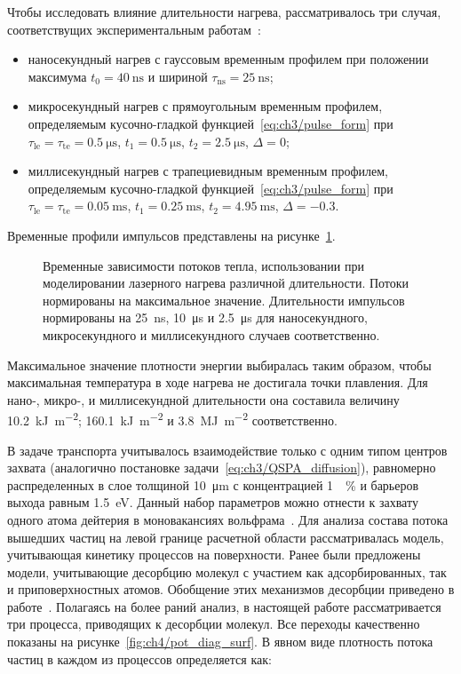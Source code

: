 Чтобы исследовать влияние длительности нагрева, рассматривалось три случая, соответствущих экспериментальным работам~\cite{Zlobinski2019,Zlobinski2020,Gasparyan2021}:
\begin{itemize}
    \item наносекундный нагрев с гауссовым временным профилем при положении максимума \( t_0 = \SI{40}{\nano\second} \) и шириной \(\tau_\mathrm{ns}=\SI{25}{\nano\second} \);
    \item микросекундный нагрев с прямоугольным временным профилем, определяемым кусочно-гладкой функцией~\cref{eq:ch3/pulse_form} при \(\tau_\mathrm{le}=\tau_\mathrm{te}=\SI{0.5}{\micro\second}\), \(t_1=\SI{0.5}{\micro\second}\), \( t_2=\SI{2.5}{\micro\second}\), \( \Delta=\num{0} \);
    \item миллисекундный нагрев с трапециевидным временным профилем, определяемым кусочно-гладкой функцией~\cref{eq:ch3/pulse_form} при \(\tau_\mathrm{le}=\tau_\mathrm{te}=\SI{0.05}{\milli\second}\), \(t_1=\SI{0.25}{\milli\second}\), \( t_2=\SI{4.95}{\milli\second}\), \( \Delta=\num{-0.3} \).
\end{itemize}
Временные профили импульсов представлены на рисунке~\cref{fig:ch4/laser_time_profiles}.
\begin{figure}[ht]
    \caption{Временные зависимости потоков тепла, использовании при моделировании лазерного нагрева различной длительности. Потоки нормированы на максимальное значение.  Длительности импульсов нормированы на \SI{25}{\nano\second}, \SI{10}{\micro\second} и \SI{2.5}{\micro\second} для наносекундного, микросекундного и миллисекундного случаев соответственно. }\label{fig:ch4/laser_time_profiles}
\end{figure}
Максимальное значение плотности энергии выбиралась таким образом, чтобы максимальная температура в ходе нагрева не достигала точки плавления. Для нано-, микро-, и миллисекундной длительности она составила величину \SI{10,2}{\kilo\joule\per\meter\squared}; \SI{160.1}{\kilo\joule\per\meter\squared} и \SI{3,8}{\mega\joule\per\meter\squared} соответственно.

В задаче транспорта учитывалось взаимодействие только с одним типом центров захвата (аналогично постановке задачи~\cref{eq:ch3/QSPA_diffusion}), равномерно распределенных в слое толщиной \SI{10}{\micro\meter} с концентрацией \SI{1}{\percent} и барьеров выхода равным \SI{1.5}{\electronvolt}. Данный набор параметров можно отнести к захвату одного атома дейтерия в моновакансиях вольфрама~\cite{Krat2018}. Для анализа состава потока вышедших частиц на левой границе расчетной области рассматривалась модель, учитывающая кинетику процессов на поверхности. Ранее были предложены модели, учитывающие десорбцию молекул с участием как адсорбированных, так и приповерхностных атомов. Обобщение этих механизмов десорбции приведено в работе~\cite{Pisarev1997}. Полагаясь на более раний анализ, в настоящей работе рассматривается три процесса, приводящих к десорбции молекул. Все переходы качественно показаны на рисунке~\cref{fig:ch4/pot_diag_surf}. В явном виде плотность потока частиц в каждом из процессов определяется как:

